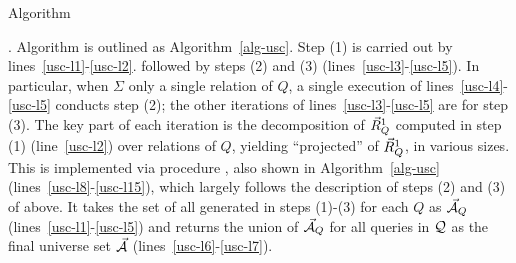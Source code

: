 \begin{myfloat}[t]
\begin{minipage}{0.50\textwidth}
{\begin{algorithm}[H]
\nonl{}
\nonl{}
\vspace{0.3cm}
\nonl{}
\nonl {}
\caption{Algorithm \usc\label{alg-usc}} 
\end{algorithm}
\DecMargin{1em}
}
\end{minipage}
\vspace{-2.4ex}
\end{myfloat}

\vspace{0.36ex}
.
Algorithm \usc is outlined as Algorithm~\ref{alg-usc}.
Step (1) is carried out by lines~\ref{usc-l1}-\ref{usc-l2}.
followed by
  steps (2) and (3) (lines~\ref{usc-l3}-\ref{usc-l5}).
In particular, when $\Sigma$ 
only a single relation of $Q$, a single execution
  of lines~\ref{usc-l4}-\ref{usc-l5} conducts step (2);
the other iterations of lines~\ref{usc-l3}-\ref{usc-l5} are for 
step (3). The key part of each iteration is the decomposition of
$\vec{R}_{Q}^{1}$ computed in step (1) (line~\ref{usc-l2}) over
relations of $Q$, yielding ``projected'' \bss of
$\vec{R}_{Q}^{1}$, in various sizes. This is implemented via
procedure \decompose, also shown
in Algorithm~\ref{alg-usc} (lines~\ref{usc-l8}-\ref{usc-l15}), which
largely follows the description of steps (2) and (3) of above.
It takes the set of all \bss generated in steps (1)-(3) for
each $Q$ as $\vec{{\mathcal A}}_{Q}$ (lines~\ref{usc-l1}-\ref{usc-l5}) and
returns the union of $\vec{{\mathcal A}}_{Q}$ for all queries in $\mathcal Q$ as the
final universe set $\vec{{\mathcal A}}$ (lines~\ref{usc-l6}-\ref{usc-l7}).


